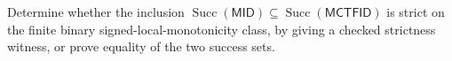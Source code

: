 Determine whether the inclusion \(\operatorname{Succ}(\mathsf{MID})\subseteq\operatorname{Succ}(\mathsf{MCTFID})\) is strict on the finite binary signed-local-monotonicity class, by giving a checked strictness witness, or prove equality of the two success sets.